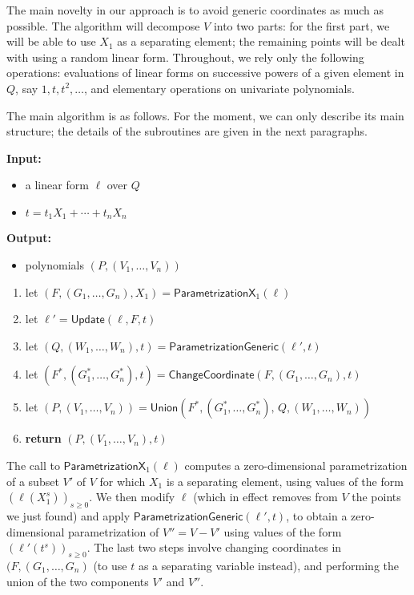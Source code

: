 \documentclass[12pt]{article}
\begin{document}
The main novelty in our approach is to avoid generic coordinates as
much as possible. The algorithm will decompose $V$ into two parts: for
the first part, we will be able to use $X_1$ as a separating element;
the remaining points will be dealt with using a random linear
form. Throughout, we rely only the following operations: evaluations
of linear forms on successive powers of a given element in $Q$, say
$1,t,t^2,\dots$, and elementary operations on univariate polynomials.

The main algorithm is as follows. For the moment, we can only describe
its main structure; the details of the subroutines are given in the
next paragraphs.

\begin{algorithm}[H]
	\caption{$\mathsf{Parametrization}(\ell,t)$} {\bf
		Input:} \vspace{-0.5em}
	\begin{itemize}\setlength\itemsep{0em}
		\item a linear form $\ell$ over $Q$
		\item $t=t_1 X_1 + \cdots + t_n X_n$
	\end{itemize}
	{\bf Output:} \vspace{-0.5em}
	\begin{itemize}\setlength\itemsep{0em}
		\item polynomials $(P,(V_1,\dots,V_n))$
	\end{itemize}
	\begin{enumerate}
		\item let $(F,(G_1,\dots,G_n),X_1)=\mathsf{ParametrizationX}_1(\ell)$
		\item let $\ell'=\mathsf{Update}(\ell,F,t)$
		\item let $(Q,(W_1,\dots,W_n),t)=\mathsf{ParametrizationGeneric}(\ell',t)$
		\item let $(F^*,(G^*_1,\dots,G^*_n),t)=\mathsf{ChangeCoordinate}(F,(G_1,\dots,G_n),t)$
		\item let  $(P,(V_1,\dots,V_n))=\mathsf{Union}(F^*,(G^*_1,\dots,G^*_n),\, Q,(W_1,\dots,W_n))$
		\item \textbf{return} $(P,(V_1,\dots,V_n),t)$
	\end{enumerate}
\end{algorithm}

The call to $\mathsf{ParametrizationX}_1(\ell)$ computes a
zero-dimensional parametrization of a subset $V'$ of $V$ for which
$X_1$ is a separating element, using values of the form
$(\ell(X_1^s))_{s \ge 0}$. We then modify $\ell$ (which in effect
removes from $V$ the points we just found) and apply
$\mathsf{ParametrizationGeneric}(\ell',t)$, to obtain a
zero-dimensional parametrization of $V''=V-V'$ using values of the form
$(\ell'(t^s))_{s \ge 0}$. The last two steps involve changing
coordinates in $(F,(G_1,\dots,G_n)$ (to use $t$ as a separating
variable instead), and performing the union of the two components $V'$
and $V''$.
\end{document}
